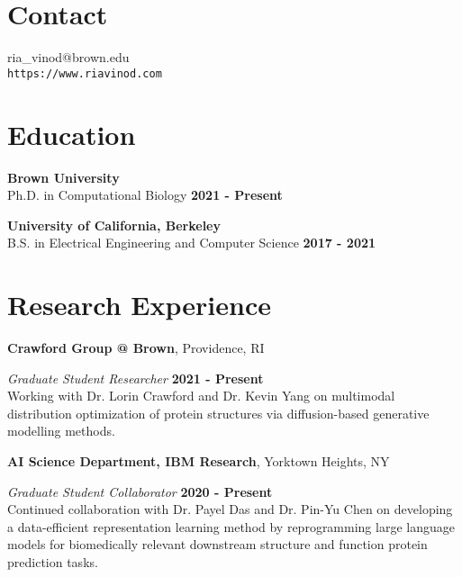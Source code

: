 \documentclass[mm,line]{res}
\begin{document}

\begin{resume}

\section{\sc Contact}
\small ria\_vinod@brown.edu \\
\small \verb+https://www.riavinod.com+


\section{\sc Education}

{\bf Brown University} \\
\vspace*{0.01in}
Ph.D. in Computational Biology \hfill \textbf{ 2021 - Present}

\vspace*{0.01in}

{\bf University of California, Berkeley} \\
\vspace*{0.01in}
B.S. in Electrical Engineering and Computer Science \hfill \textbf{2017 - 2021}

\vspace*{-0.1in}

\section{\sc Research Experience}

{\bf Crawford Group @ Brown}, Providence, RI

\vspace{-.4cm}
{\em Graduate Student Researcher} \hfill {\bf 2021 - Present}\\
Working with Dr. Lorin Crawford and Dr. Kevin Yang on multimodal distribution optimization of protein structures via diffusion-based generative modelling methods.

{\bf AI Science Department, IBM Research}, Yorktown Heights, NY

\vspace{-.4cm}
{\em Graduate Student Collaborator} \hfill {\bf 2020 - Present}\\
Continued collaboration with Dr. Payel Das and Dr. Pin-Yu Chen on developing a data-efficient representation learning method by reprogramming large language models for biomedically relevant downstream structure and function protein prediction tasks.



\end{resume}
\end{document}
